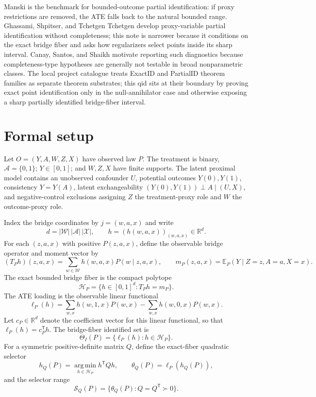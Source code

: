 \documentclass[11pt]{article}
\newcommand{\E}{\mathbb{E}}
\newcommand{\transpose}{\mathsf{T}}
\newcommand{\calH}{\mathcal{H}}
\newcommand{\R}{\mathbb{R}}
\theoremstyle{definition}
\theoremstyle{plain}
\theoremstyle{remark}
\begin{document}
Manski \cite{Manski1990AER} is the benchmark for bounded-outcome partial
identification: if proxy restrictions are removed, the ATE falls back to the
natural bounded range.  Ghassami, Shpitser, and Tchetgen Tchetgen
\cite{GhassamiShpitserTchetgen2023ProxyPI} develop proxy-variable partial
identification without completeness; this note is narrower because it
conditions on the exact bridge fiber and asks how regularizers select points
inside its sharp interval.  Canay, Santos, and Shaikh
\cite{CanaySantosShaikh2013Econometrica} motivate reporting such diagnostics
because completeness-type hypotheses are generally not testable in broad
nonparametric classes.  The local project catalogue treats ExactID and
PartialID theorem families as separate theorem substrates; this qid sits at
their boundary by proving exact point identification only in the
null-annihilator case and otherwise exposing a sharp partially identified
bridge-fiber interval.

\section{Formal setup}
Let \(O=(Y,A,W,Z,X)\) have observed law \(P\).  The treatment is binary,
\(\mathcal A=\{0,1\}\); \(Y\in[0,1]\); and \(W,Z,X\) have finite supports.
The latent proximal model contains an unobserved confounder \(U\), potential
outcomes \(Y(0),Y(1)\), consistency \(Y=Y(A)\), latent exchangeability
\((Y(0),Y(1))\perp A\mid(U,X)\), and negative-control exclusions assigning
\(Z\) the treatment-proxy role and \(W\) the outcome-proxy role.

Index the bridge coordinates by \(j=(w,a,x)\) and write
\[
  d=|\mathcal W|\,|\mathcal A|\,|\mathcal X|,
  \qquad
  h=(h(w,a,x))_{(w,a,x)}\in\R^d .
\]
For each \((z,a,x)\) with positive \(P(z,a,x)\), define the observable bridge
operator and moment vector by
\[
  (T_Ph)(z,a,x)=\sum_{w\in\mathcal W} h(w,a,x)P(w\mid z,a,x),
  \qquad
  m_P(z,a,x)=\E_P(Y\mid Z=z,A=a,X=x).
\]
The exact bounded bridge fiber is the compact polytope
\[
  \calH_P=\{h\in[0,1]^d:T_Ph=m_P\}.
\]
The ATE loading is the observable linear functional
\[
  \ell_P(h)
  =
  \sum_{w,x} h(w,1,x)P(w,x)
  -
  \sum_{w,x} h(w,0,x)P(w,x).
\]
Let \(c_P\in\R^d\) denote the coefficient vector for this linear functional,
so that \(\ell_P(h)=c_P^\transpose h\).  The bridge-fiber identified set is
\[
  \Theta_I(P)=\{\ell_P(h):h\in\calH_P\}.
\]
For a symmetric positive-definite matrix \(Q\), define the exact-fiber
quadratic selector
\[
  h_Q(P)=\operatorname*{arg\,min}_{h\in\calH_P}h^\transpose Qh,
  \qquad
  \theta_Q(P)=\ell_P(h_Q(P)),
\]
and the selector range
\[
  \mathcal S_Q(P)=\{\theta_Q(P):Q=Q^\transpose\succ0\}.
\]
\end{document}
